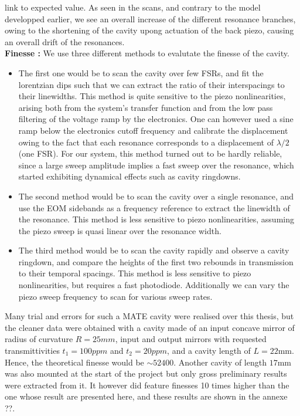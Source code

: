 \color{red} link to expected value\color{black}. As seen in the scans, and contrary to the model developped earlier, we see an overall increase of the different resonance branches, owing to the shortening of the cavity upong actuation of the back piezo, causing an overall drift of the resonances. \\

\noindent  \textbf{Finesse :} We use three different methods to evalutate the finesse of the cavity. 
\begin{itemize}
  \item The first one would be to scan the cavity over few FSRs, and fit the lorentzian dips such that we can extract the ratio of their interspacings to their linewidths. This method is quite sensitive to the piezo nonlinearities, arising both from the system's transfer function and from the low pass filtering of the voltage ramp by the electronics. One can however used a sine ramp below the electronics cutoff frequency and calibrate the displacement owing to the fact that each resonance corresponds to a displacement of $\lambda/2$ (one FSR). For our system, this method turned out to be hardly reliable, since a large sweep amplitude implies a fast sweep over the resonance, which started exhibiting dynamical effects such as cavity ringdowns. 
  \item The second method would be to scan the cavity over a single resonance, and use the EOM sidebands as a frequency reference to extract the linewidth of the resonance. This method is less sensitive to piezo nonlinearities, assuming the piezo sweep is quasi linear over the resonance width. 
  \item The third method would be to scan the cavity rapidly and observe a cavity ringdown, and compare the heights of the first two rebounds in transmission to their temporal spacings. This method is less sensitive to piezo nonlinearities, but requires a fast photodiode. Additionally we can vary the piezo sweep frequency to scan for various sweep rates. 
\end{itemize}


Many trial and errors for such a MATE cavity were realised over this thesis, but the cleaner data were obtained with a cavity made of an input concave mirror of radius of curvature $R=25mm$, input and output mirrors with requested transmittivities $t_1=100ppm$ and $t_2=20ppm$, and a cavity length of $L=22$mm. Hence, the theoretical finesse would be $\sim 52400$. Another cavity of length $17$mm was also mounted at the start of the project but only gross preliminary results were extracted from it. It however did feature finesses 10 times higher than the one whose result are presented here, and these results are shown in the annexe ??. \\ 

